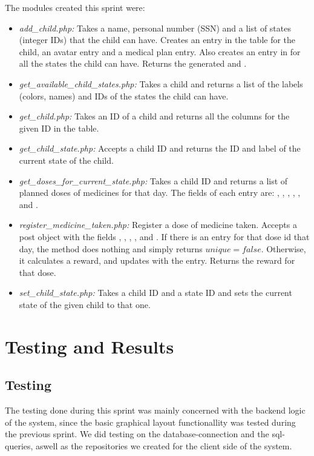 The modules created this sprint were:
\begin{itemize}
  \item \emph{add\_child.php:} Takes a name, personal number (SSN) and a list of states (integer IDs) that the child can have. Creates an entry in the  table for the child, an avatar entry and a medical plan entry. Also creates an entry in  for all the states the child can have. Returns the generated  and .
  \item \emph{get\_available\_child\_states.php:} Takes a child  and returns a list of the labels (colors, names) and IDs of the states the child can have.
  \item \emph{get\_child.php:} Takes an ID of a child and returns all the columns for the given ID in the  table.
  \item \emph{get\_child\_state.php:} Accepts a child ID and returns the ID and label of the current state of the child.
  \item \emph{get\_doses\_for\_current\_state.php:} Takes a child ID and returns a list of planned doses of medicines for that day. The fields of each entry are: , , , , ,  and .
  \item \emph{register\_medicine\_taken.php:} Register a dose of medicine taken. Accepts a post object with the fields , , , ,  and . If there is an entry for that dose id that day, the method does nothing and simply returns $unique=false$. Otherwise, it calculates a reward, and updates  with the entry. Returns the reward for that dose.
  \item \emph{set\_child\_state.php:} Takes a child ID and a state ID and sets the current state of the given child to that one.
\end{itemize}

\section{Testing and Results}
\label{sec:sprint2testingAndResults}

\subsection{Testing}
The testing done during this sprint was mainly concerned with the backend logic of the system,
since the basic graphical layout functionallity was tested during the previous sprint. We did 
testing on the database-connection and 
the sql-queries, aswell as the repositories we created for the client side of the system.

